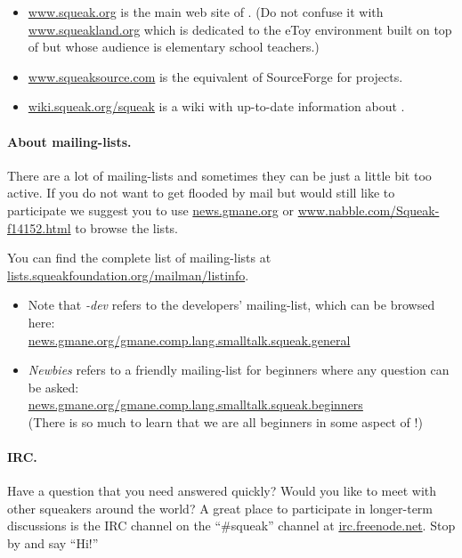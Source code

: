 \documentclass[a4paper,10pt,twoside]{book}
\begin{document}
\begin{itemize}
\item \url{www.squeak.org} is the main web site of \sq. (Do not confuse it with \url{www.squeakland.org} which is dedicated to the eToy environment built on top of \sq but whose audience is elementary school teachers.)

\item \url{www.squeaksource.com} is the equivalent of SourceForge for \sq projects.

\item \url{wiki.squeak.org/squeak} is a wiki with up-to-date information about \sq.
\end{itemize}

\paragraph{About mailing-lists.} There are a lot of mailing-lists and sometimes they can be just a little bit too active. If you do not want to get flooded by mail but would still like to participate we suggest you to use \url{news.gmane.org} or \url{www.nabble.com/Squeak-f14152.html} to browse the lists.

You can find the complete list of \sq mailing-lists at \url{lists.squeakfoundation.org/mailman/listinfo}.

\begin{itemize}
\item Note that \emph{\sq-dev} refers to the developers' mailing-list, which can be browsed here:\\
\url{news.gmane.org/gmane.comp.lang.smalltalk.squeak.general}
\item \emph{Newbies} refers to a friendly mailing-list for beginners where any question can be asked:\\
\url{news.gmane.org/gmane.comp.lang.smalltalk.squeak.beginners}\\
(There is so much to learn that we are all beginners in some aspect of \sq!)
\end{itemize}

\paragraph{IRC.}
Have a question that you need answered quickly? Would you like to meet with other squeakers around the world? A great place to participate in longer-term discussions is the IRC channel on the ``\#squeak'' channel at \url{irc.freenode.net}. Stop by and say ``Hi!''
\end{document}
